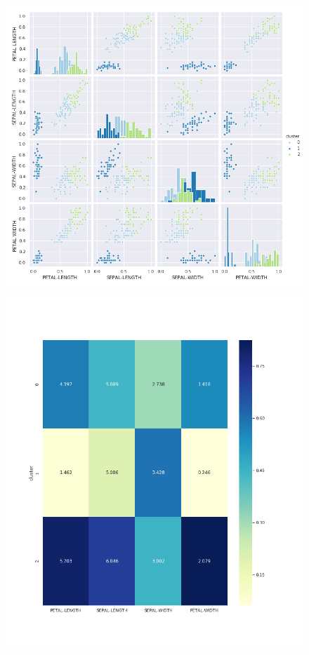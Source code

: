 \documentclass[spanish]{beamer}
\begin{document}
\begin{frame}
\begin{figure}[h]
\centering
\includegraphics[scale=0.34]{dani/scatmatrixK-MeansIRIS.png}
\end{figure}
\end{frame}

\begin{frame}
\begin{figure}[h]
\centering
\includegraphics[scale=0.29]{dani/heatmapK-MeansIRIS.png}
\end{figure}
\end{frame}
\end{document}
